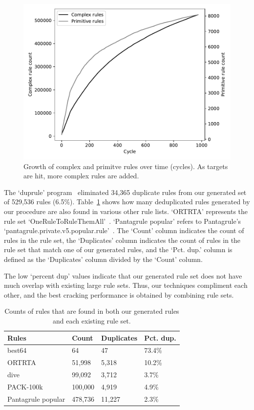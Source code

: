\documentclass{article}
\begin{document}
\begin{figure}[h!]
\centering
\includegraphics[width=0.7\linewidth]
{figures/stats-rules_composites_size.pdf}
\caption{Growth of complex and primitve rules over time (cycles). As targets
are hit, more complex rules are added. }
\label{fig:rule-count}
\end{figure}

The `duprule' program~\autocite{duprule} eliminated 34,365 duplicate rules from our
generated set of 529,536 rules (6.5\%). Table~\ref{tab:dups} shows how many
deduplicated rules generated by our procedure are also found in various other
rule lists. `ORTRTA' represents the rule set
`OneRuleToRuleThemAll'~\autocite{ortrta}. `Pantagrule popular' refers to
Pantagrule's `pantagrule.private.v5.popular.rule'~\autocite{pantagrule}. The
`Count'
column indicates the count of rules in the rule set, the `Duplicates' column
indicates the count of rules in the rule set that match one of our generated
rules, and the `Pct. dup.' column is defined as the `Duplicates' column divided
by the `Count' column.

The low `percent dup' values indicate that our generated rule set
does
not have much overlap with existing large rule sets. Thus, our techniques
compliment each other, and the best cracking performance is obtained
by combining rule sets.


\begin{table}
\centering
\begin{tabular}{|l|l|l|l|}
    \hline
    Rules & Count & Duplicates & Pct. dup. \\
    \hline
    best64 & 64 & 47 & 73.4\% \\
    ORTRTA & 51,998 & 5,318 & 10.2\% \\
    dive & 99,092 & 3,712 & 3.7\% \\
    PACK-100k & 100,000 & 4,919 & 4.9\% \\
    Pantagrule popular & 478,736 & 11,227 & 2.3\% \\
    \hline
\end{tabular}
\caption{Counts of rules that are found in both our generated rules and each
existing rule set.}
\label{tab:dups}
\end{table}
\end{document}
